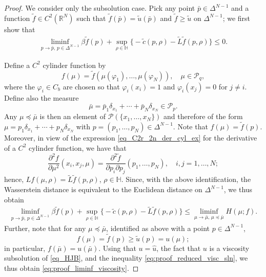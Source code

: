 \documentclass{article}
\theoremstyle{definition}
\numberwithin{equation}{section}
\numberwithin{theorem}{section}
\newcommand{\R}{\mathbb{R}}
\newcommand{\Hb}{\mathbb{H}}
\newcommand{\Pc}{\mathcal{P}}
\newcommand{\Pcal}{{\mathcal P}}
\begin{document}
\begin{proof}
We consider only the subsolution case. Pick any point $\bar p\in\Delta^{N-1}$ and a function $\tilde f\in C^2(\R^N)$ such that $\tilde f(\bar p)=\tilde u(\bar p)$ and $\tilde f\ge\tilde u$ on $\Delta^{N-1}$; we first show that
\begin{align}\label{eq:proof_liminf_viscosity}
\liminf_{p\to\bar p,\, p\in\Delta^{N-1}}\beta \tilde f(p) + \sup_{\rho\in\Hb}\big\{ - \tilde c(p,\rho) - \tilde L\tilde f(p,\rho)\big\}
\le 0.
\end{align}

Define a $C^2$ cylinder function by
\[
f(\mu) = \tilde f(\mu(\varphi_1),\ldots,\mu(\varphi_N)),
\quad \mu\in\Pc_q,
\]
where the $\varphi_i\in C_b$ are chosen so that $\varphi_i(x_i)=1$ and $\varphi_i(x_j)=0$ for $j\ne i$. Define also the measure
\[
\bar\mu =\bar p_1\delta_{x_1} + \cdots + \bar p_N\delta_{x_N}\in\Pc_p.
\]
Any $\mu\preceq\bar\mu$ is then an element of $\Pcal(\{x_1,\ldots,x_N\})$ and therefore of the form $\mu=p_1\delta_{x_1}+\cdots+p_N\delta_{x_N}$ with $p=(p_1,\ldots,p_N)\in\Delta^{N-1}$. Note that $f(\mu) = \tilde f(p)$. Moreover, in view of the expression \eqref{eq_C2r_2n_der_cyl_ex} for the derivative of a $C^2$ cylinder function, we have that
\[
\frac{\partial^2 f}{\partial \mu^2}(x_i,x_j,\mu) = \frac{\partial^2 \tilde f}{\partial p_i\partial p_j}(p_1,\ldots,p_N),
\quad i,j=1,\ldots,N;
\]
hence, $Lf(\mu,\rho)=\tilde L\tilde f(p,\rho)$, $\rho\in\Hb$. Since, with the above identification, the Wasserstein distance is equivalent to the Euclidean distance on $\Delta^{N-1}$, we thus obtain
\begin{align}\label{eq:proof_reduced_visc_sln}
\liminf_{p\to\bar p,\, p\in\Delta^{N-1}}\beta \tilde f(p) + \sup_{\rho\in\Hb}\big\{ - \tilde c(p,\rho) - \tilde L\tilde f(p,\rho)\big\}
\le \liminf_{\mu\to\bar\mu,\, \mu\preceq\bar\mu} H(\mu;f).
\end{align}
Further, note that for any $\mu\preceq\bar\mu$, identified as above with a point $p\in\Delta^{N-1}$,
\[
f(\mu) = \tilde f(p) \ge \tilde u(p) = u(\mu);
\]
in particular, $f(\bar\mu)=u(\bar\mu)$. Using that $u=\hat u$, the fact that $u$ is a viscosity subsolution of \eqref{eq_HJB}, and the inequality \eqref{eq:proof_reduced_visc_sln}, we thus obtain \eqref{eq:proof_liminf_viscosity}.



\end{proof}
\end{document}
